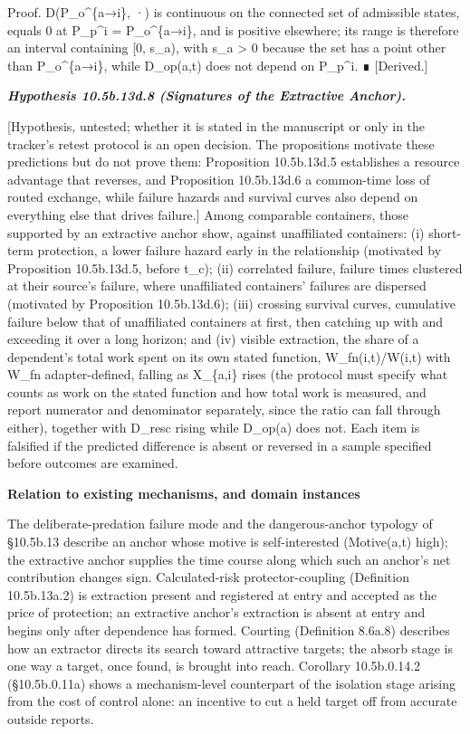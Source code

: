 \documentclass[
]{article}
\begin{document}
Proof. D(P\_o\^{}\{a→i\}, ·) is continuous on the connected set of
admissible states, equals 0 at P\_p\^{}i = P\_o\^{}\{a→i\}, and is
positive elsewhere; its range is therefore an interval containing {[}0,
s\_a), with s\_a \textgreater{} 0 because the set has a point other than
P\_o\^{}\{a→i\}, while D\_op(a,t) does not depend on P\_p\^{}i. ∎
{[}Derived.{]}

\emph{\textbf{Hypothesis 10.5b.13d.8 (Signatures of the Extractive
Anchor).}}

{[}Hypothesis, untested; whether it is stated in the manuscript or only
in the tracker's retest protocol is an open decision. The propositions
motivate these predictions but do not prove them: Proposition
10.5b.13d.5 establishes a resource advantage that reverses, and
Proposition 10.5b.13d.6 a common-time loss of routed exchange, while
failure hazards and survival curves also depend on everything else that
drives failure.{]} Among comparable containers, those supported by an
extractive anchor show, against unaffiliated containers: (i) short-term
protection, a lower failure hazard early in the relationship (motivated
by Proposition 10.5b.13d.5, before t\_c); (ii) correlated failure,
failure times clustered at their source's failure, where unaffiliated
containers' failures are dispersed (motivated by Proposition
10.5b.13d.6); (iii) crossing survival curves, cumulative failure below
that of unaffiliated containers at first, then catching up with and
exceeding it over a long horizon; and (iv) visible extraction, the share
of a dependent's total work spent on its own stated function,
W\_fn(i,t)/W(i,t) with W\_fn adapter-defined, falling as X\_\{a,i\}
rises (the protocol must specify what counts as work on the stated
function and how total work is measured, and report numerator and
denominator separately, since the ratio can fall through either),
together with D\_resc rising while D\_op(a) does not. Each item is
falsified if the predicted difference is absent or reversed in a sample
specified before outcomes are examined.

\textbf{Relation to existing mechanisms, and domain instances}

The deliberate-predation failure mode and the dangerous-anchor typology
of §10.5b.13 describe an anchor whose motive is self-interested
(Motive(a,t) high); the extractive anchor supplies the time course along
which such an anchor's net contribution changes sign. Calculated-risk
protector-coupling (Definition 10.5b.13a.2) is extraction present and
registered at entry and accepted as the price of protection; an
extractive anchor's extraction is absent at entry and begins only after
dependence has formed. Courting (Definition 8.6a.8) describes how an
extractor directs its search toward attractive targets; the absorb stage
is one way a target, once found, is brought into reach. Corollary
10.5b.0.14.2 (§10.5b.0.11a) shows a mechanism-level counterpart of the
isolation stage arising from the cost of control alone: an incentive to
cut a held target off from accurate outside reports.
\end{document}
